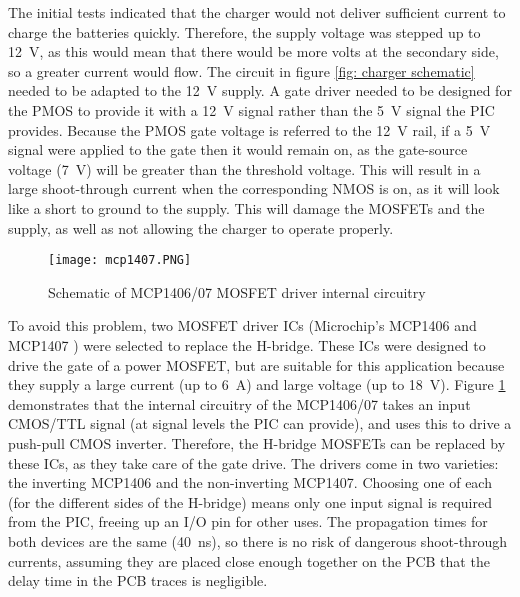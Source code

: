 

The initial tests indicated that the charger would not deliver sufficient current to charge the batteries quickly. Therefore, the supply voltage was stepped up to \SI{12}{\volt}, as this would mean that there would be more volts at the secondary side, so a greater current would flow. The circuit in figure \ref{fig: charger schematic} needed to be adapted to the \SI{12}{\volt} supply. A gate driver needed to be designed for the PMOS to provide it with a \SI{12}{\volt} signal rather than the \SI{5}{\volt} signal the PIC provides. Because the PMOS gate voltage is referred to the \SI{12}{\volt} rail, if a \SI{5}{\volt} signal were applied to the gate then it would remain on, as the gate-source voltage (\SI{7}{\volt}) will be greater than the threshold voltage. This will result in a large shoot-through current when the corresponding NMOS is on, as it will look like a short to ground to the supply. This will damage the MOSFETs and the supply, as well as not allowing the charger to operate properly. 

\begin{figure}[htbp]
	\centering
	\texttt{[image: mcp1407.PNG]}
	\caption{Schematic of MCP1406/07 MOSFET driver internal circuitry \cite{mcp1407}}
	\label{fig: mcp1407}
\end{figure}

To avoid this problem, two MOSFET driver ICs (Microchip's MCP1406 and MCP1407 \cite{mcp1407}) were selected to replace the H-bridge. These ICs were designed to drive the gate of a power MOSFET, but are suitable for this application because they supply a large current (up to \SI{6}{\ampere}) and large voltage (up to \SI{18}{\volt}). Figure \ref{fig: mcp1407} demonstrates that the internal circuitry of the MCP1406/07 takes an input CMOS/TTL signal (at signal levels the PIC can provide), and uses this to drive a push-pull CMOS inverter. Therefore, the H-bridge MOSFETs can be replaced by these ICs, as they take care of the gate drive. The drivers come in two varieties: the inverting MCP1406 and the non-inverting MCP1407. Choosing one of each (for the different sides of the H-bridge) means only one input signal is required from the PIC, freeing up an I/O pin for other uses. The propagation times for both devices are the same (\SI{40}{\nano\second}), so there is no risk of dangerous shoot-through currents, assuming they are placed close enough together on the PCB that the delay time in the PCB traces is negligible.\\

